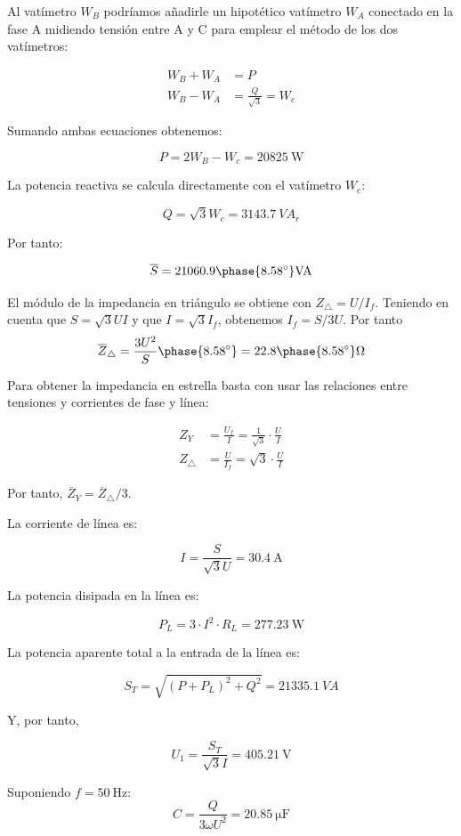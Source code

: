 Al vatímetro $W_B$ podríamos añadirle un hipotético vatímetro
$W_A$ conectado en la fase A midiendo tensión entre A y C para
emplear el método de los dos vatímetros:


\begin{align*}
W_B + W_A &= P\\
W_B - W_A &= \frac{Q}{\sqrt{3}} = W_c
\end{align*}

Sumando ambas ecuaciones obtenemos:

\[
  P = 2 W_B - W_c = \SI{20825}{\watt}
\]

La potencia reactiva se calcula directamente con el vatímetro $W_c$:

\[
  Q = \sqrt{3} W_c = \SI{3143.7}{VA}_r
\]

Por tanto:

\[
  \overline{S} =
  21060.9\phase{\ang{8.58}}\unit{VA}
\]

El módulo de la impedancia en triángulo se obtiene con
$Z_{\triangle} = U / I_f$. Teniendo en cuenta que $S = \sqrt{3} U I$
y que $I = \sqrt{3} I_f$, obtenemos $I_f = S / 3U$. Por tanto
\[
  \overline{Z}_{\triangle} = \frac{3 U^2}{S}\phase{\ang{8.58}} =
  {22.8\phase{\ang{8.58}}}\unit{\ohm}
\]


Para obtener la impedancia en estrella basta con usar las relaciones
entre tensiones y corrientes de fase y línea:

\begin{align*}
  Z_Y &= \frac{U_f}{I} = \frac{1}{\sqrt{3}} \cdot \frac{U}{I}\\
  Z_\triangle &= \frac{U}{I_f} = \sqrt{3} \cdot \frac{U}{I}
\end{align*}

Por tanto, $\overline{Z}_{Y} = \overline{Z}_{\triangle} / 3$.

La corriente de línea es:

\[
  I = \frac{S}{\sqrt{3} U} = \SI{30.4}{\ampere}
\]

La potencia disipada en la línea es:

\[
  P_L = 3 \cdot I^2 \cdot R_L = \SI{277.23}{\watt}
\]

La potencia aparente total a la entrada de la línea es:

\[
  S_T = \sqrt{(P + P_L)^2 + Q^2} = \SI{21335.1}{VA}
\]

Y, por tanto,

\[
  U_1 = \frac{S_T}{\sqrt{3} I} = \SI{405.21}{\volt}
\]

Suponiendo $f = \SI{50}{\hertz}$:
\[
  C = \frac{Q}{3 \omega U^2} = \SI{20.85}{\micro\farad}
\]

